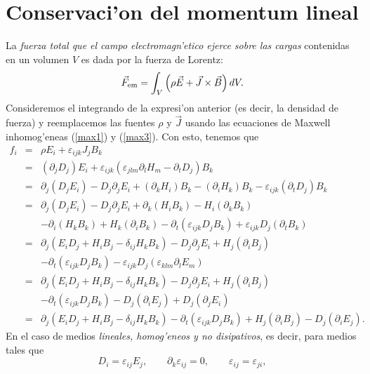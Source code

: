 \section{Conservaci'on del momentum lineal}\label{sec:momentum}
La \textit{fuerza total que el campo electromagn'etico ejerce sobre las cargas} contenidas en un volumen $V$ es dada por la fuerza de Lorentz:
\begin{equation}
\vec{F}_{\rm em}=\int_V\left(\rho\vec{E}+\vec{J}\times\vec{B}\right)dV .
\end{equation}
Consideremos el integrando de la expresi'on anterior (es decir, la densidad de fuerza) y reemplacemos las fuentes $\rho$ y $\vec{J}$ usando las ecuaciones de Maxwell inhomog'eneas (\ref{max1}) y (\ref{max3}). Con esto, tenemos que
\begin{eqnarray}
f_i&=&\rho E_i+\varepsilon_{ijk}J_jB_k \\
&=&(\partial_jD_j)E_i+\varepsilon_{ijk}(\varepsilon_{
jlm}\partial_lH_m-\partial_tD_j)B_k  \\
&=& \partial_j(D_jE_i)-D_j\partial_jE_i +
(\partial_kH_i)B_k-(\partial_iH_k)B_k-\varepsilon_{ijk}(\partial_tD_j)B_k \\
&=& \partial_j(D_jE_i)-D_j\partial_jE_i +
\partial_k(H_iB_k)-H_i(\partial_kB_k) \nonumber\\
&& -\partial_i(H_kB_k)+H_k(\partial_iB_k)
-\partial_t(\varepsilon_{ijk} D_jB_k)
+\varepsilon_{ijk} D_j(\partial_tB_k) \\
&=&\partial_j(E_iD_j+H_iB_j-\delta_{ij}H_kB_k)
-D_j\partial_jE_i+H_j(\partial_iB_j) \nonumber\\
&& -\partial_t(\varepsilon_{ijk}
D_jB_k)-\varepsilon_{ijk} D_j(\varepsilon_{klm}\partial_lE_m) \\
&=&\partial_j(E_iD_j+H_iB_j-\delta_{ij}H_kB_k)
-D_j\partial_jE_i+H_j(\partial_iB_j) \nonumber\\
&& -\partial_t(\varepsilon_{ijk} D_jB_k)-D_j(\partial_iE_j) +D_j(\partial_jE_i)\\
&=&\partial_j(E_iD_j+H_iB_j-\delta_{ij}H_kB_k)-\partial_t(\varepsilon_{ijk}
D_jB_k)+H_j(\partial_iB_j)- D_j(\partial_iE_j). \label{flc}
\end{eqnarray}
En el caso de medios \textit{lineales, homog'eneos y no disipativos}, es decir, para medios tales que
\begin{equation}
 D_i=\varepsilon_{ij}E_j, \qquad \partial_k\varepsilon_{ij}=0, \qquad \varepsilon_{ij}=\varepsilon_{ji},
\end{equation}
